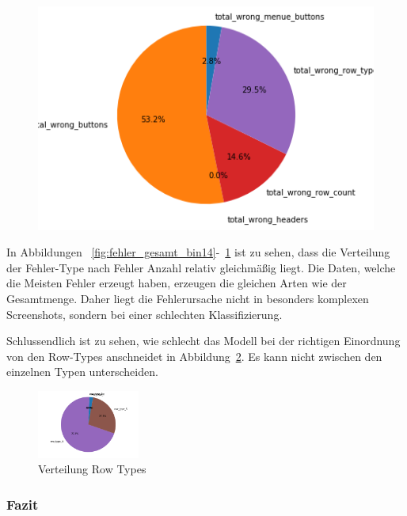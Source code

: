 \documentclass[pdftex,a4paper,halfparskip, article]{scrartcl}
\begin{document}
\begin{figure}
\begin{minipage}{.33\textwidth}
  \centering
   \includegraphics[width=1\linewidth]{predictions_bin14_p80_error_types_pie_chart}
  \label{fig:fehler_schlechteste20_bin14}
\end{minipage}
\end{figure}

In Abbildungen ~\ref{fig:fehler_gesamt_bin14}-~\ref{fig:fehler_schlechteste20_bin14} ist zu sehen, dass die Verteilung der Fehler-Type nach Fehler Anzahl relativ gleichmäßig liegt. Die Daten, welche die Meisten Fehler erzeugt haben, erzeugen die gleichen Arten wie der Gesamtmenge. Daher liegt die Fehlerursache nicht in besonders komplexen Screenshots, sondern bei einer schlechten Klassifizierung.

Schlussendlich ist zu sehen, wie schlecht das Modell bei der richtigen Einordnung von den Row-Types anschneidet in Abbildung~\ref{fig:bin14_row_type}. Es kann nicht zwischen den einzelnen Typen unterscheiden.


\begin{figure}[h]
\centering
\includegraphics[width=0.3\textwidth]{predictions_bin14_predicted_row_type_distribution}
\caption{Verteilung Row Types}
\label{fig:bin14_row_type}
\end{figure}


\subsubsection*{Fazit}
\end{document}
